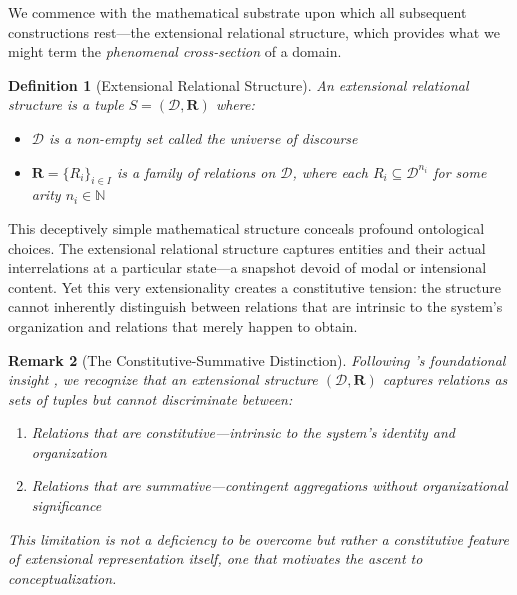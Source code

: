 \documentclass[11pt,a4paper]{article}
\newtheorem{definition}{Definition}[section]
\newtheorem{remark}[definition]{Remark}
\newcommand{\domain}{\mathcal{D}}
\begin{document}
We commence with the mathematical substrate upon which all subsequent constructions rest---the extensional relational structure, which provides what we might term the \emph{phenomenal cross-section} of a domain.

\begin{definition}[Extensional Relational Structure]
An \emph{extensional relational structure} \citep[cf.][]{genesereth1987} is a tuple $S = (\domain, \mathbf{R})$ where:
\begin{itemize}
    \item $\domain$ is a non-empty set called the \emph{universe of discourse}
    \item $\mathbf{R} = \{R_i\}_{i \in I}$ is a family of relations on $\domain$, where each $R_i \subseteq \domain^{n_i}$ for some arity $n_i \in \mathbb{N}$
\end{itemize}
\end{definition}

This deceptively simple mathematical structure conceals profound ontological choices. The extensional relational structure captures entities and their actual interrelations at a particular state---a snapshot devoid of modal or intensional content. Yet this very extensionality creates a constitutive tension: the structure cannot inherently distinguish between relations that are intrinsic to the system's organization and relations that merely happen to obtain.

\begin{remark}[The Constitutive-Summative Distinction]
Following \citeauthor{bertalanffy1968}'s foundational insight \citep{bertalanffy1968}, we recognize that an extensional structure $(\domain, \mathbf{R})$ captures relations as sets of tuples but cannot discriminate between:
\begin{enumerate}
    \item Relations that are \emph{constitutive}---intrinsic to the system's identity and organization
    \item Relations that are \emph{summative}---contingent aggregations without organizational significance
\end{enumerate}
This limitation is not a deficiency to be overcome but rather a constitutive feature of extensional representation itself, one that motivates the ascent to conceptualization.
\end{remark}
\end{document}
